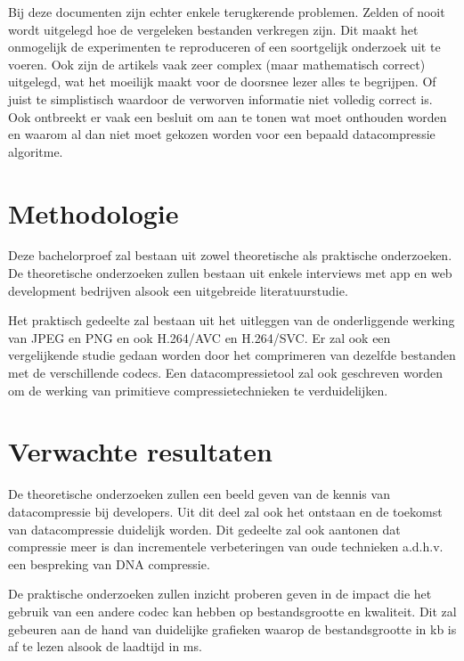 Bij deze documenten zijn echter enkele terugkerende problemen. Zelden of nooit wordt uitgelegd hoe de vergeleken bestanden verkregen zijn. Dit maakt het onmogelijk de experimenten te reproduceren of een soortgelijk onderzoek uit te voeren. Ook zijn de artikels vaak zeer complex (maar mathematisch correct) uitgelegd, wat het moeilijk maakt voor de doorsnee lezer alles te begrijpen. Of juist te simplistisch waardoor de verworven informatie niet volledig correct is. Ook ontbreekt er vaak een besluit om aan te tonen wat moet onthouden worden en waarom al dan niet moet gekozen worden voor een bepaald datacompressie algoritme. 

\section{Methodologie}
\label{sec:methodologie}

Deze bachelorproef zal bestaan uit zowel theoretische als praktische onderzoeken. De theoretische onderzoeken zullen bestaan uit enkele interviews met app en web development bedrijven alsook een uitgebreide literatuurstudie.

Het praktisch gedeelte zal bestaan uit het uitleggen van de onderliggende werking van JPEG en PNG en ook H.264/AVC en H.264/SVC. Er zal ook een vergelijkende studie gedaan worden door het comprimeren van dezelfde bestanden met de verschillende codecs. Een datacompressietool zal ook geschreven worden om de werking van primitieve compressietechnieken te verduidelijken.

\section{Verwachte resultaten}
\label{sec:verwachte_resultaten}

De theoretische onderzoeken zullen een beeld geven van de kennis van datacompressie bij developers. Uit dit deel zal ook het ontstaan en de toekomst van datacompressie duidelijk worden. Dit gedeelte zal ook aantonen dat compressie meer is dan incrementele verbeteringen van oude technieken a.d.h.v. een bespreking van DNA compressie.

De praktische onderzoeken zullen inzicht proberen geven in de impact die het gebruik van een andere codec kan hebben op bestandsgrootte en kwaliteit. Dit zal gebeuren aan de hand van duidelijke grafieken waarop de bestandsgrootte in kb is af te lezen alsook de laadtijd in ms.

